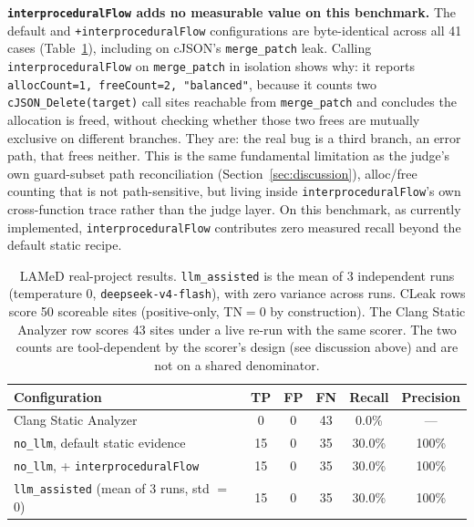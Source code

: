 \documentclass[11pt,a4paper]{article}
\begin{document}
\textbf{\texttt{interproceduralFlow} adds no measurable value on this
benchmark.} The default and \texttt{+interproceduralFlow} configurations
are byte-identical across all 41 cases (Table~\ref{tab:lamed}), including on
cJSON's \texttt{merge\_patch} leak. Calling \texttt{interproceduralFlow} on
\texttt{merge\_patch} in isolation shows why: it reports
\texttt{allocCount=1, freeCount=2, "balanced"}, because it counts two
\texttt{cJSON\_Delete(target)} call sites reachable from \texttt{merge\_patch}
and concludes the allocation is freed, without checking whether those two
frees are mutually exclusive on different branches. They are: the real
bug is a third branch, an error path, that frees neither. This is the same
fundamental limitation as the judge's own guard-subset path reconciliation
(Section~\ref{sec:discussion}), alloc/free counting that is not
path-sensitive, but living inside \texttt{interproceduralFlow}'s own
cross-function trace rather than the judge layer. On this benchmark, as
currently implemented, \texttt{interproceduralFlow} contributes zero
measured recall beyond the default static recipe.

\begin{table}[htbp]
\centering
\caption{LAMeD real-project results. \texttt{llm\_assisted} is the mean of 3
independent runs (temperature 0, \texttt{deepseek-v4-flash}), with zero
variance across runs. CLeak rows score 50 scoreable sites (positive-only,
TN$=$0 by construction). The Clang Static Analyzer row scores 43 sites under
a live re-run with the same scorer. The two counts are tool-dependent by
the scorer's design (see discussion above) and are not on a shared
denominator.}
\label{tab:lamed}
\small
\begin{tabular}{@{}lccccc@{}}
\toprule
\textbf{Configuration} & \textbf{TP} & \textbf{FP} & \textbf{FN} & \textbf{Recall} & \textbf{Precision} \\
\midrule
Clang Static Analyzer & 0 & 0 & 43 & 0.0\% & --- \\
\texttt{no\_llm}, default static evidence & 15 & 0 & 35 & 30.0\% & 100\% \\
\texttt{no\_llm}, + \texttt{interproceduralFlow} & 15 & 0 & 35 & 30.0\% & 100\% \\
\texttt{llm\_assisted} (mean of 3 runs, std $=$ 0) & 15 & 0 & 35 & 30.0\% & 100\% \\
\bottomrule
\end{tabular}
\end{table}
\end{document}
